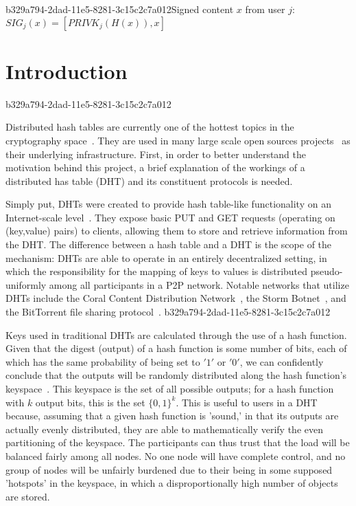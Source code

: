 \documentclass[12pt]{article}
\begin{document}
b329a794-2dad-11e5-8281-3c15c2c7a012Signed content $x$ from user $j$: $SIG_j(x) = \left[ PRIVK_j( H(x) ), x \right]$

\section{Introduction}
b329a794-2dad-11e5-8281-3c15c2c7a012\par Distributed hash tables are currently one of the hottest topics in the cryptography space~\cite{Stoica:2001dj,Rowstron:2001ea,Ratnasamy:2001wn}. They are used in many large scale open sources projects~\cite{Freitas:2013tb,Xu:2010vs,Perfitt:2010fh} as their underlying infrastructure. First, in order to better understand the motivation behind this project, a brief explanation of the workings of a distributed has table (DHT) and its constituent protocols is needed.

\par Simply put, DHTs were created to provide hash table-like functionality on an Internet-scale level~\cite{Ratnasamy:2001wn}. They expose basic PUT and GET requests (operating on (key,value) pairs) to clients, allowing them to store and retrieve information from the DHT. The difference between a hash table and a DHT is the scope of the mechanism: DHTs are able to operate in an entirely decentralized setting, in which the responsibility for the mapping of keys to values is distributed pseudo-uniformly among all participants in a P2P network. Notable networks that utilize DHTs include the Coral Content Distribution Network~\cite{Freedman:2004vb}, the Storm Botnet~\cite{Holz:2008uk}, and the BitTorrent file sharing protocol~\cite{Cohen:y1_8mBnw}.
b329a794-2dad-11e5-8281-3c15c2c7a012
\par Keys used in traditional DHTs are calculated through the use of a hash function. Given that the digest (output) of a hash function is some number of bits, each of which has the same probability of being set to $'1'$ or $'0'$, we can confidently conclude that the outputs will be randomly distributed along the hash function's keyspace~. This keyspace is the set of all possible outputs; for a hash function with $k$ output bits, this is the set $\{0,1\}^k$. This is useful to users in a DHT because, assuming that a given hash function is 'sound,' in that its outputs are actually evenly distributed, they are able to mathematically verify the even partitioning of the keyspace. The participants can thus trust that the load will be balanced fairly among all nodes. No one node will have complete control, and no group of nodes will be unfairly burdened due to their being in some supposed 'hotspots' in the keyspace, in which a disproportionally high number of objects are stored.~
\end{document}
